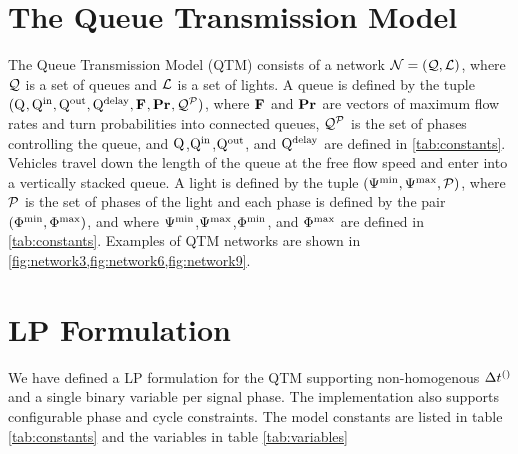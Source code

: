 \section{The Queue Transmission Model}
The Queue Transmission Model (QTM) consists of a network $\Net = (\Qset,\Lset)$, where $\Qset$ is a set of queues and $\Lset$ is a set of lights. A queue is defined by the tuple $(\QMAX{},\QIN{},\QOUT{},\QDELAY{},\Fvec{},\Prvec{},\QPset{})$, where $\Fvec{}$ and $\Prvec{}$ are vectors of maximum flow rates and turn probabilities into connected queues, $\QPset{}$ is the set of phases controlling the queue, and $\QMAX{}$,$\QIN{}$,$\QOUT{}$, and $\QDELAY{}$ are defined in \cref{tab:constants}. Vehicles travel down the length of the queue at the free flow speed and enter into a vertically stacked queue. A light is defined by the tuple $(\CTMIN{}{},\CTMAX{}{},\Pset)$, where $\Pset$ is the set of phases of the light and each phase is defined by the pair $(\PTMIN[]{}{},\PTMAX[]{}{})$, and where $\CTMIN{}{}$,$\CTMAX{}{}$,$\PTMIN[]{}{}$, and $\PTMAX[]{}{}$ are defined in \cref{tab:constants}. Examples of QTM networks are shown in \cref{fig:network3,fig:network6,fig:network9}.



\section{LP Formulation}
We have defined a LP formulation for the QTM supporting non-homogenous $\DT[]$ and a single binary variable per signal phase. The implementation also supports configurable phase and cycle constraints. The model constants are listed in table \ref{tab:constants} and the variables in table \ref{tab:variables}

